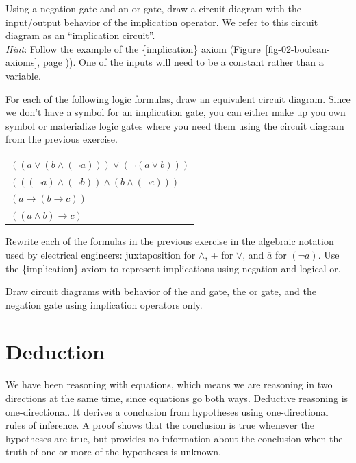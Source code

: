 \begin{ExerciseList}
\Exercise Using a negation-gate and an or-gate, draw a circuit diagram with the input/output behavior of the implication operator.
We refer to this circuit diagram as an ``implication circuit''.\\
\emph{Hint}: Follow the example of the \{implication\} axiom
(Figure~\ref{fig-02-boolean-axioms}, page \pageref{fig-02-boolean-axioms})).
One of the inputs will need to be a constant rather than a variable.

\Exercise For each of the following logic formulas, draw an equivalent circuit diagram.
Since we don't have a symbol for an implication gate,
you can either make up you own symbol or
materialize logic gates where you need them
using the circuit diagram from the previous exercise.
\begin{center}
\begin{tabular}{l}
$((a \vee (b \wedge (\neg a))) \vee (\neg (a \vee b)))$ \\
$(((\neg a) \wedge (\neg b)) \wedge (b \wedge (\neg c)))$ \\
$(a \rightarrow (b \rightarrow c))$ \\
$((a \wedge b) \rightarrow c)$ \\
\end{tabular}
\end{center}

\Exercise Rewrite each of the formulas in the previous exercise
in the algebraic notation used by electrical engineers:
juxtaposition for $\wedge$, + for $\vee$, and $\overline{a}$ for $(\neg a)$.
Use the \{implication\} axiom to represent
implications using negation and logical-or.

\Exercise Draw circuit diagrams with behavior
of the and gate, the or gate, and the negation gate
using implication operators only.
\end{ExerciseList}


\section{Deduction}

We have been reasoning with equations, which means we are reasoning in two directions
at the same time, since equations go both ways. Deductive reasoning is one-directional.
It derives a conclusion from hypotheses using one-directional rules of inference.
A proof shows that the conclusion is true whenever the hypotheses are true, but provides
no information about the conclusion when the truth of one or more of the hypotheses is
unknown.

